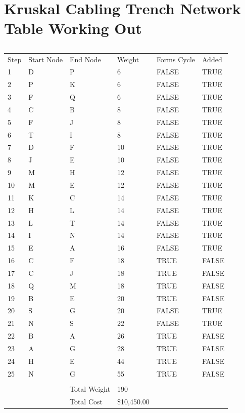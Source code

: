 \documentclass[11pt]{book}
\renewcommand{\=}[1]{\stackrel{#1}{=}} %
\theoremstyle{definition}
\theoremstyle{remark}
\begin{document}
\section{Kruskal Cabling Trench Network Table Working Out}
\begin{table}[]
\begin{tabular}{llllll}
Step & Start Node & End Node & Weight & Forms Cycle & Added \\
1 & D & P & 6 & FALSE & \cellcolor[HTML]{67FD9A}TRUE \\
2 & P & K & 6 & FALSE & \cellcolor[HTML]{67FD9A}TRUE \\
3 & F & Q & 6 & FALSE & \cellcolor[HTML]{67FD9A}TRUE \\
4 & C & B & 8 & FALSE & \cellcolor[HTML]{67FD9A}TRUE \\
5 & F & J & 8 & FALSE & \cellcolor[HTML]{67FD9A}TRUE \\
6 & T & I & 8 & FALSE & \cellcolor[HTML]{67FD9A}TRUE \\
7 & D & F & 10 & FALSE & \cellcolor[HTML]{67FD9A}TRUE \\
8 & J & E & 10 & FALSE & \cellcolor[HTML]{67FD9A}TRUE \\
9 & M & H & 12 & FALSE & \cellcolor[HTML]{67FD9A}TRUE \\
10 & M & E & 12 & FALSE & \cellcolor[HTML]{67FD9A}TRUE \\
11 & K & C & 14 & FALSE & \cellcolor[HTML]{67FD9A}TRUE \\
12 & H & L & 14 & FALSE & \cellcolor[HTML]{67FD9A}TRUE \\
13 & L & T & 14 & FALSE & \cellcolor[HTML]{67FD9A}TRUE \\
14 & I & N & 14 & FALSE & \cellcolor[HTML]{67FD9A}TRUE \\
15 & E & A & 16 & FALSE & \cellcolor[HTML]{67FD9A}TRUE \\
16 & C & F & 18 & TRUE & \cellcolor[HTML]{FD6864}FALSE \\
17 & C & J & 18 & TRUE & \cellcolor[HTML]{FD6864}FALSE \\
18 & Q & M & 18 & TRUE & \cellcolor[HTML]{FD6864}FALSE \\
19 & B & E & 20 & TRUE & \cellcolor[HTML]{FD6864}FALSE \\
20 & S & G & 20 & FALSE & \cellcolor[HTML]{67FD9A}TRUE \\
21 & N & S & 22 & FALSE & \cellcolor[HTML]{67FD9A}TRUE \\
22 & B & A & 26 & TRUE & \cellcolor[HTML]{FD6864}FALSE \\
23 & A & G & 28 & TRUE & \cellcolor[HTML]{FD6864}FALSE \\
24 & H & E & 44 & TRUE & \cellcolor[HTML]{FD6864}FALSE \\
25 & N & G & 55 & TRUE & \cellcolor[HTML]{FD6864}FALSE \\
 &  &  &  &  &  \\
 &  & Total Weight & 190 &  &  \\
 &  & Total Cost & \$10,450.00 &  & 
\end{tabular}
\caption{}
\label{tab:my-table}
\end{table}
\end{document}
